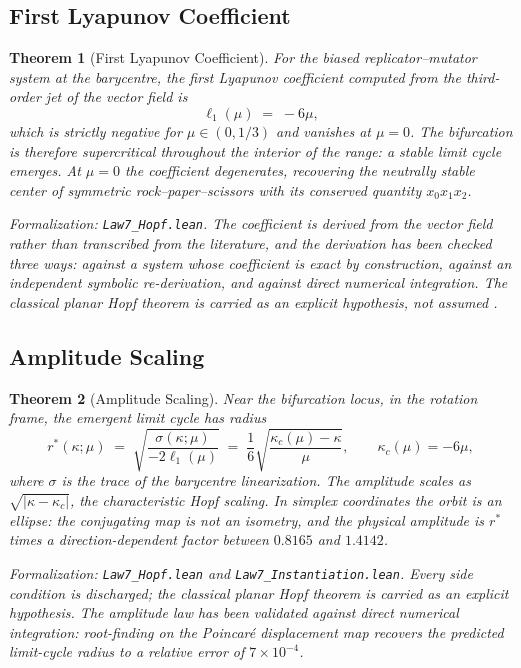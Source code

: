 \documentclass[12pt]{article}
\newtheorem{theorem}{Theorem}[section]
\begin{document}
\subsection{First Lyapunov Coefficient}

\begin{theorem}[First Lyapunov Coefficient]
For the biased replicator--mutator system at the barycentre, the first Lyapunov
coefficient computed from the third-order jet of the vector field is
\[
\ell_1(\mu) \;=\; -6\mu,
\]
which is strictly negative for $\mu \in (0,1/3)$ and vanishes at $\mu = 0$. The
bifurcation is therefore supercritical throughout the interior of the range: a
stable limit cycle emerges. At $\mu = 0$ the coefficient degenerates, recovering
the neutrally stable center of symmetric rock--paper--scissors with its
conserved quantity $x_0 x_1 x_2$.
\end{theorem}
\noindent\textit{Formalization: \texttt{Law7\_Hopf.lean}. The coefficient is derived from the vector field rather than transcribed from the literature, and the derivation has been checked three ways: against a system whose coefficient is exact by construction, against an independent symbolic re-derivation, and against direct numerical integration. The classical planar Hopf theorem is carried as an explicit hypothesis, not assumed \citep{guckenheimer1983nonlinear}.}

\subsection{Amplitude Scaling}

\begin{theorem}[Amplitude Scaling]
Near the bifurcation locus, in the rotation frame, the emergent limit cycle has
radius
\[
r^*(\kappa;\mu) \;=\; \sqrt{\frac{\sigma(\kappa;\mu)}{-2\ell_1(\mu)}}
\;=\; \frac{1}{6}\sqrt{\frac{\kappa_c(\mu) - \kappa}{\mu}},
\qquad \kappa_c(\mu) = -6\mu,
\]
where $\sigma$ is the trace of the barycentre linearization. The amplitude scales
as $\sqrt{|\kappa - \kappa_c|}$, the characteristic Hopf scaling. In simplex
coordinates the orbit is an ellipse: the conjugating map is not an isometry, and
the physical amplitude is $r^*$ times a direction-dependent factor between
$0.8165$ and $1.4142$.
\end{theorem}
\noindent\textit{Formalization: \texttt{Law7\_Hopf.lean} and \texttt{Law7\_Instantiation.lean}. Every side condition is discharged; the classical planar Hopf theorem is carried as an explicit hypothesis. The amplitude law has been validated against direct numerical integration: root-finding on the Poincar\'e displacement map recovers the predicted limit-cycle radius to a relative error of $7 \times 10^{-4}$.}
\end{document}
